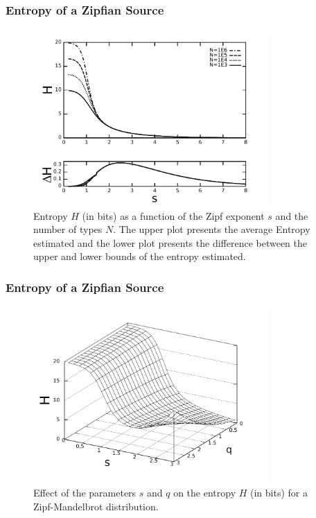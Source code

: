 \documentclass{beamer}
\begin{document}
\frame
{
  \frametitle{Entropy of a Zipfian Source}
  \vspace{-0.5cm}
  \begin{figure}[h]
  \centering
  \includegraphics[width=0.8\textwidth]{imagespresentation/entropy_N_s_limits_fulldh_pb2.pdf}
  \vspace{-0.2cm}
  \caption{\scriptsize Entropy $H$ (in bits) as a function of the Zipf exponent $s$ and the number of types $N$. The upper plot presents the average Entropy estimated and the lower plot presents the difference between the upper and lower bounds of the entropy estimated.}
  \label{fig:entropy_N_s}
  \end{figure}
}


\frame
{
  \frametitle{Entropy of a Zipfian Source}
  \vspace{-0.5cm}
  \begin{figure}[h]
  \centering
  \includegraphics[width=0.8\textwidth]{images/zipfmandelbrot_entropy_sq_surface.pdf}
  \caption{Effect of the parameters $s$ and $q$ on the entropy $H$ (in bits) for a Zipf-Mandelbrot distribution.}
  \label{fig:zipfmandelbrot_entropy_sq_surface}
  \end{figure}
}
\end{document}

